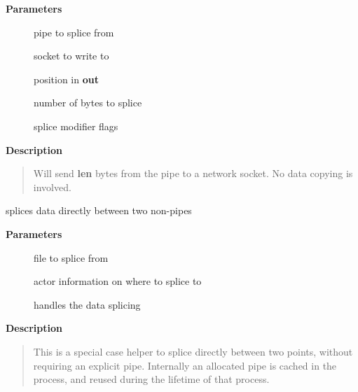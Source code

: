 \documentclass[a4paper,8pt,english]{sphinxmanual}
\begin{document}
\textbf{Parameters}
\begin{description}
\item[{}] \leavevmode
pipe to splice from

\item[{}] \leavevmode
socket to write to

\item[{}] \leavevmode
position in \textbf{out}

\item[{}] \leavevmode
number of bytes to splice

\item[{}] \leavevmode
splice modifier flags

\end{description}

\textbf{Description}
\begin{quote}

Will send \textbf{len} bytes from the pipe to a network socket. No data copying
is involved.
\end{quote}

\begin{fulllineitems}
\label{filesystems/index:c.splice_direct_to_actor}
splices data directly between two non-pipes

\end{fulllineitems}


\textbf{Parameters}
\begin{description}
\item[{}] \leavevmode
file to splice from

\item[{}] \leavevmode
actor information on where to splice to

\item[{}] \leavevmode
handles the data splicing

\end{description}

\textbf{Description}
\begin{quote}

This is a special case helper to splice directly between two
points, without requiring an explicit pipe. Internally an allocated
pipe is cached in the process, and reused during the lifetime of
that process.
\end{quote}
\end{document}
